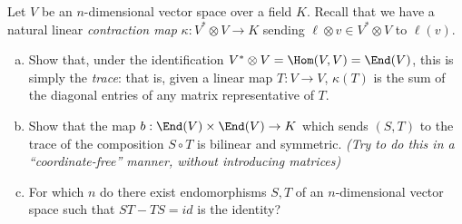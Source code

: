 \begin{problem}
Let $V$ be an $n$-dimensional vector space over a field $K$. Recall that we have a natural linear \emph{contraction map} $\kappa : V^* \otimes V \to K$ sending $\ell \otimes v \in V^* \otimes V$ to $\ell(v)$. 
\begin{enumerate}[(a)]
  \item Show that, under the identification  $V^* \otimes V = \Hom(V,V) = \End(V)$, this is simply the \emph{trace}: that is, given a linear map $T : V \to V$, $\kappa(T)$ is the sum of the diagonal entries of any matrix representative of $T$.
  \item Show that the map  $b : \End(V) \times \End(V) \to K$ which sends $(S,T)$ to the trace of the composition $S \circ T$ is bilinear and symmetric. \textit{(Try to do this in a ``coordinate-free'' manner, without introducing matrices)}
  \item For which $n$ do there exist endomorphisms $S, T$ of an $n$-dimensional vector space such that $ST - TS = id$ is the identity?
\end{enumerate}
\end{problem}